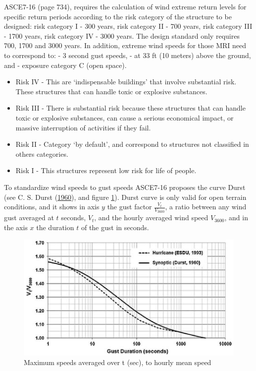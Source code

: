 \documentclass[12pt,oneside]{reedthesis}
\providecommand{\tightlist}{%
  \setlength{\itemsep}{0pt}\setlength{\parskip}{0pt}}
\begin{document}
ASCE7-16 (page 734), requires the calculation of wind extreme return levels for specific return periods according to the risk category of the structure to be designed: risk category I - 300 years, risk category II - 700 years, risk category III - 1700 years, risk category IV - 3000 years. The design standard only requires 700, 1700 and 3000 years. In addition, extreme wind speeds for those MRI need to correspond to: - 3 second gust speeds, - at 33 ft (10 meters) above the ground, and - exposure category C (open space).
\begin{itemize}
\tightlist
\item
  Risk IV - This are `indispensable buildings' that involve substantial risk. These structures that can handle toxic or explosive substances.
\item
  Risk III - There is substantial risk because these structures that can handle toxic or explosive substances, can cause a serious economical impact, or massive interruption of activities if they fail.
\item
  Risk II - Category `by default', and correspond to structures not classified in others categories.
\item
  Risk I - This structures represent low risk for life of people.
\end{itemize}
To standardize wind speeds to gust speeds ASCE7-16 proposes the curve Durst (see C. S. Durst (\protect\hyperlink{ref-Durst1960}{1960}), and figure \ref{fig:durstcurve}). Durst curve is only valid for open terrain conditions, and it shows in axis \(y\) the gust factor \(\frac{V_t}{V_{3600}}\), a ratio between any wind gust averaged at \(t\) seconds, \(V_t\), and the hourly averaged wind speed \(V_{3600}\), and in the axis \(x\) the duration \(t\) of the gust in seconds.

\footnotesize
\begin{figure}
\includegraphics[width=6.14in]{figure/durst} \caption{Maximum speeds averaged over t (sec), to hourly mean speed}\label{fig:durstcurve}
\end{figure}
\normalsize
\end{document}
